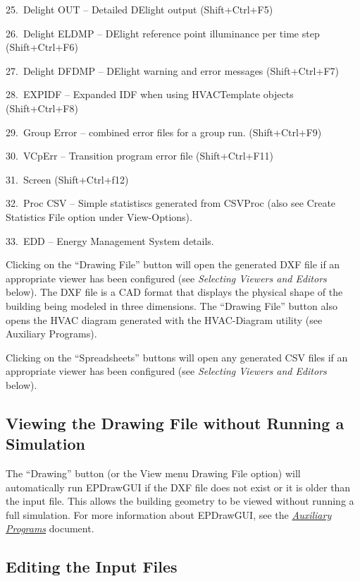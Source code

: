 25.~Delight OUT -- Detailed DElight output (Shift+Ctrl+F5)

26.~Delight ELDMP -- DElight reference point illuminance per time step (Shift+Ctrl+F6)

27.~Delight DFDMP -- DElight warning and error messages (Shift+Ctrl+F7)

28.~EXPIDF -- Expanded IDF when using HVACTemplate objects (Shift+Ctrl+F8)

29.~Group Error -- combined error files for a group run. (Shift+Ctrl+F9)

30.~VCpErr -- Transition program error file (Shift+Ctrl+F11)

31.~Screen (Shift+Ctrl+f12)

32.~Proc CSV -- Simple statistiscs generated from CSVProc (also see Create Statistics File option under View-Options).

33.~EDD -- Energy Management System details.

Clicking on the ``Drawing File'' button will open the generated DXF file if an appropriate viewer has been configured (see \emph{Selecting Viewers and Editors} below). The DXF file is a CAD format that displays the physical shape of the building being modeled in three dimensions. The ``Drawing File'' button also opens the HVAC diagram generated with the HVAC-Diagram utility (see Auxiliary Programs).

Clicking on the ``Spreadsheets'' buttons will open any generated CSV files if an appropriate viewer has been configured (see \emph{Selecting Viewers and Editors} below).

\subsection{Viewing the Drawing File without Running a Simulation}\label{viewing-the-drawing-file-without-running-a-simulation}

The ``Drawing'' button (or the View menu Drawing File option) will automatically run EPDrawGUI if the DXF file does not exist or it is older than the input file. This allows the building geometry to be viewed without running a full simulation. For more information about EPDrawGUI, see the \href{AuxiliaryPrograms.pdf}{\emph{Auxiliary Programs}} document.

\subsection{Editing the Input Files}\label{editing-the-input-files}

